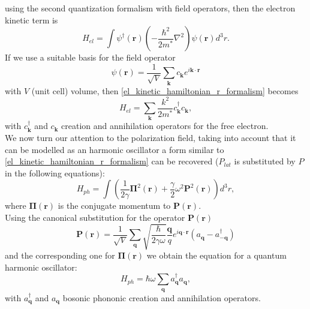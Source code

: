 using the second quantization formalism with field operators, then the electron kinetic term is
\begin{equation}
    H_{el}=\int\psi^\dagger(\mathbf{r})\left(-\frac{\hbar^2}{2m^*}\nabla^2\right)\psi(\mathbf{r})d^3r.
    \label{el_kinetic_hamiltonian_r_formalism}
\end{equation}
If we use a suitable basis for the field operator
\begin{equation}
    \psi(\mathbf{r})=\frac{1}{\sqrt{V}}\sum_\mathbf{k}c_\mathbf{k}e^{i\mathbf{k}\cdot\mathbf{r}}
    \label{from_r_to_k_electron_field_operator}
\end{equation}
with $V$ (unit cell) volume, then \ref{el_kinetic_hamiltonian_r_formalism} becomes
\begin{equation}
    H_{el}=\sum_\mathbf{k}\frac{k^2}{2m^*}c^\dagger_\mathbf{k}c_\mathbf{k},
    \label{el_kinetic_hamiltonian_k_formalism}
\end{equation}
with $c^\dagger_\mathbf{k}$ and $c_\mathbf{k}$ creation and annihilation operators for the free electron.\\
We now turn our attention to the polarization field, taking into account that it can be modelled as an harmonic oscillator a 
form similar to \ref{el_kinetic_hamiltonian_r_formalism} can be recovered ($P_{lat}$ is substituted by $P$ in the following equations):
\begin{equation}
    H_{ph}=\int\left(\frac{1}{2\gamma}\mathbf{\Pi}^2(\mathbf{r})+\frac{\gamma}{2}\omega^2\mathbf{P}^2(\mathbf{r})\right)d^3r,
\end{equation}
where $\mathbf{\Pi}(\mathbf{r})$ is the conjugate momentum to $\mathbf{P}(\mathbf{r})$.\\
Using the canonical substitution for the operator $\mathbf{P}(\mathbf{r})$ 
\begin{equation}
    \mathbf{P}(\mathbf{r})=\frac{1}{\sqrt{V}}\sum_{\mathbf{q}}\sqrt{\frac{\hbar}{2\gamma\omega}}\frac{\mathbf{q}}{q}e^{i\mathbf{q}\cdot\mathbf{r}}(a_\mathbf{q}-a_\mathbf{-q}^\dagger)
     \label{P_expansion_quantum}
\end{equation}
and the corresponding one for $\mathbf{\Pi}(\mathbf{r})$ we obtain the equation for a quantum harmonic oscillator:
\begin{equation}
    H_{ph}=\hbar\omega\sum_\mathbf{q} a^\dagger_\mathbf{q}a_\mathbf{q},
\end{equation}
with $a^\dagger_\mathbf{q}$ and $a_\mathbf{q}$ bosonic phononic creation and annihilation operators.\\ 
